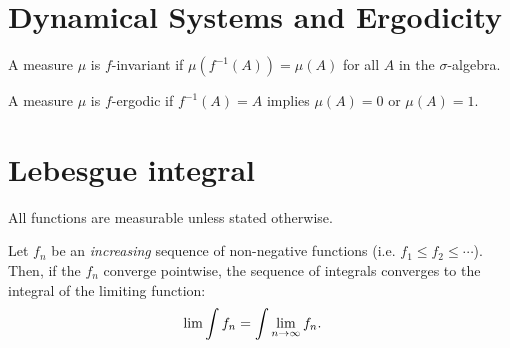 \section{Dynamical Systems and Ergodicity}

\begin{definition}
  A measure $\mu$ is $f$-invariant if $\mu(f^{-1}(A)) = \mu(A)$ for all $A$ in the $\sigma$-algebra.
\end{definition}

\begin{definition}
  A measure $\mu$ is $f$-ergodic if $f^{-1}(A) = A$ implies $\mu(A) = 0$ or $\mu(A) = 1$.
\end{definition}

\section{Lebesgue integral}

All functions are measurable unless stated otherwise.

\begin{theorem*}[MCT]
  Let $f_n$ be an {\it increasing} sequence of non-negative functions (i.e. $f_1 \leq f_2 \leq \cdots$). Then, if
  the $f_n$ converge pointwise, the sequence of integrals converges to the integral of the limiting function:
  \begin{align*}
    \lim \int f_n &= \int \limn f_n.
  \end{align*}
\end{theorem*}



